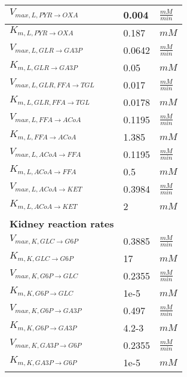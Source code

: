 \begin{supertabular}{lll}
$V_{max, L,PYR \xrightarrow[]{} OXA}$ & 0.004 & $\frac{mM}{min}$       \\ \hline
$K_{m, L,PYR \xrightarrow[]{} OXA}$ & 0.187 & $mM$   \\ \hline

$V_{max, L,GLR \xrightarrow[]{} GA3P}$ & 0.0642 & $\frac{mM}{min}$       \\ \hline
$K_{m, L,GLR \xrightarrow[]{} GA3P}$ & 0.05 & $mM$   \\ 

$V_{max, L,GLR , FFA \xrightarrow[]{} TGL}$ & 0.017 & $\frac{mM}{min}$       \\ \hline
$K_{m, L,GLR , FFA \xrightarrow[]{} TGL}$ & 0.0178 & $mM$   \\ \hline

$V_{max, L,FFA \xrightarrow[]{} ACoA}$ & 0.1195 & $\frac{mM}{min}$       \\ \hline
$K_{m, L,FFA \xrightarrow[]{} ACoA}$ & 1.385 & $mM$   \\ \hline

$V_{max, L,ACoA \xrightarrow[]{} FFA}$ & 0.1195 & $\frac{mM}{min}$       \\ \hline
$K_{m, L,ACoA \xrightarrow[]{} FFA}$ & 0.5 & $mM$   \\ \hline

$V_{max, L,ACoA \xrightarrow[]{} KET}$ & 0.3984 & $\frac{mM}{min}$       \\ \hline
$K_{m, L,ACoA \xrightarrow[]{} KET}$ & 2 & $mM$   \\ \hline

\textbf{Kidney reaction rates} \\ \hline
$V_{max, K,GLC \xrightarrow[]{} G6P}$ & 0.3885 & $\frac{mM}{min}$       \\ \hline
$K_{m, K,GLC \xrightarrow[]{} G6P}$ & 17 & $mM$   \\ \hline

$V_{max, K,G6P \xrightarrow[]{} GLC}$ & 0.2355 & $\frac{mM}{min}$       \\ \hline
$K_{m, K,G6P \xrightarrow[]{} GLC}$ & 1e-5 & $mM$   \\ \hline

$V_{max, K,G6P \xrightarrow[]{} GA3P}$ & 0.497 & $\frac{mM}{min}$       \\ \hline
$K_{m, K,G6P \xrightarrow[]{} GA3P}$ & 4.2-3 & $mM$   \\ \hline

$V_{max, K,GA3P \xrightarrow[]{} G6P}$ & 0.2355 & $\frac{mM}{min}$       \\ \hline
$K_{m, K,GA3P \xrightarrow[]{} G6P}$ & 1e-5 & $mM$   \\ \hline


\end{supertabular}

